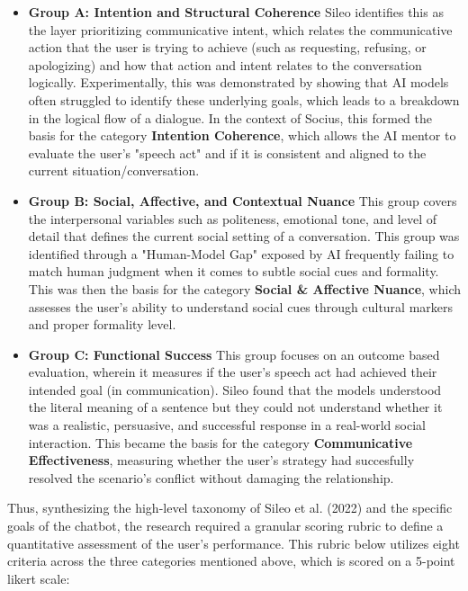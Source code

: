 \begin{itemize}
    \item \textbf{Group A: Intention and Structural Coherence} 
    Sileo identifies this as the layer prioritizing communicative intent, which relates the communicative action that the user is trying to achieve (such as requesting, refusing, or apologizing) and how that action and intent relates to the conversation logically. 
    Experimentally, this was demonstrated by showing that AI models often struggled to identify these underlying goals, which leads to a breakdown in the logical flow of a dialogue. In the context of Socius, this formed the basis for the category \textbf{Intention Coherence}, which allows 
    the AI mentor to evaluate the user's "speech act" and if it is consistent and aligned to the current situation/conversation.
    \item \textbf{Group B: Social, Affective, and Contextual Nuance}
    This group covers the interpersonal variables such as politeness, emotional tone, and level of detail that defines the current social setting of a conversation. This group was identified through a "Human-Model Gap" exposed by AI frequently failing to match human judgment when it comes to subtle social cues and formality.
    This was then the basis for the category \textbf{Social \& Affective Nuance}, which assesses the user's ability to understand social cues through cultural markers and proper formality level. 
    \item \textbf{Group C: Functional Success}
    This group focuses on an outcome based evaluation, wherein it measures if the user's speech act had achieved their intended goal (in communication). Sileo found that the models understood the literal meaning of a sentence but they could not understand whether it was a realistic, persuasive, and successful response in a real-world social interaction.
    This became the basis for the category \textbf{Communicative Effectiveness}, measuring whether the user's strategy had succesfully resolved the scenario's conflict without damaging the relationship.    
\end{itemize}

Thus, synthesizing the high-level taxonomy of Sileo et al. (2022) and the specific goals of the chatbot, the research required a granular scoring rubric to define a quantitative assessment of the user's performance. This rubric below utilizes eight criteria across the three categories mentioned above, which is scored on a 5-point likert scale:

